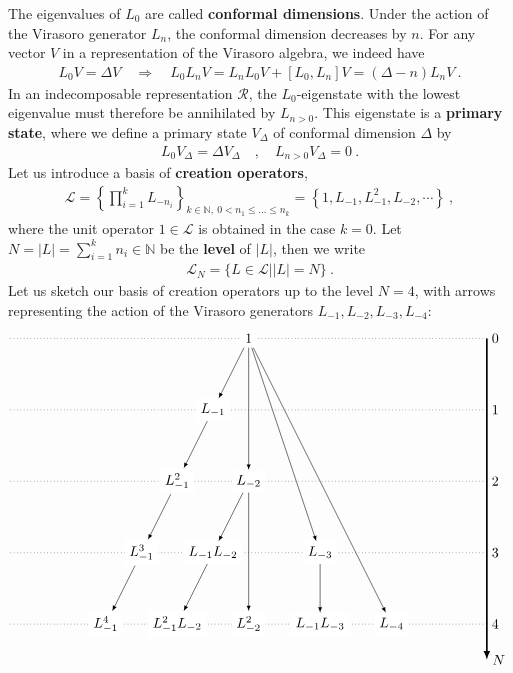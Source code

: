 \documentclass[12pt, a4paper]{article}
\newcommand{\myindex}[1]{\textbf{\boldmath #1}}
\begin{document}
The eigenvalues of $L_0$ are called \myindex{conformal dimensions}. Under the action of the Virasoro generator $L_n$, the conformal dimension decreases by $n$. For any vector $V$ in a representation of the Virasoro algebra, we indeed have
\begin{align}
 L_0V{} = \Delta V{} \quad \Rightarrow\quad  L_0 L_nV{} = L_nL_0V{} + [L_0, L_n] V{}  = (\Delta-n)L_nV{} \ .
\end{align}
In an indecomposable representation $\mathcal{R}$, the $L_0$-eigenstate with the lowest eigenvalue must therefore be annihilated by $L_{n>0}$. This eigenstate is a \myindex{primary state}, where we define a primary state $V_\Delta$ of conformal dimension $\Delta$ by 
\begin{align}
  \boxed{L_0 V_\Delta = \Delta V_\Delta \quad , \quad L_{n>0} V_\Delta = 0}\ .
 \end{align}
Let us introduce a basis of \myindex{creation operators},
\begin{align}
 \mathcal{L} = \left\{\prod_{i=1}^k L_{-n_i} \right\}_{k\in\mathbb{N},\ 0<n_1\leq \dots \leq n_k}=\left\{1, L_{-1}, L_{-1}^2, L_{-2},\cdots \right\}\ ,
 \label{lcm}
\end{align}
where the unit operator $1\in \mathcal{L}$ is obtained in the case $k=0$.
Let  $N=|L|=\sum_{i=1}^k n_i \in\mathbb{N}$ be the  \myindex{level} of $|L|$, then we write
\begin{align}
 \mathcal{L}_N = \Big\{ L\in\mathcal{L}\Big| |L|=N\Big\}\ . 
\label{ln}
 \end{align}
Let us sketch our basis of creation operators up to the level $N=4$, with arrows representing the action of the Virasoro generators $L_{-1},L_{-2},L_{-3},L_{-4}$:
 \begin{align}
 \begin{tikzpicture}[scale = .3, baseline=(current  bounding  box.center)]
  \draw[-latex, very thick] (20, 0) -- (20, -27) node [right] {$N$};
  \foreach \x in {0, ..., 4}
  {
  \draw [dotted] (-20, {-6*\x}) -- (20, {-6*\x}) node [right] {${\x}$};
  }
  \node[fill = white] at (0, 0) (0) {$1$};
  \node[fill = white] at (-3,-6) (1) {$L_{-1}$};
  \node[fill = white] at (-6, -12) (11) {$L_{-1}^2$};
  \node[fill = white] at (-9, -18) (111) {$L_{-1}^3$};
  \node[fill = white] at (-12, -24) (1111) {$L_{-1}^4$};
  \node[fill = white] at (0,-12) (2) {$L_{-2}$};
  \node[fill = white] at (-3,-18) (12) {$L_{-1}L_{-2}$};
  \node[fill = white] at (-6,-24) (112) {$L_{-1}^2L_{-2}$};
  \node[fill = white] at (0,-24) (22) {$L_{-2}^2$};
  \node[fill = white] at (6,-18) (3) {$L_{-3}$};
  \node[fill = white] at (6,-24) (13) {$L_{-1}L_{-3}$};
  \node[fill = white] at (12,-24) (4) {$L_{-4}$};
  \draw[-latex] (0) -- (1);
  \draw[-latex] (1) -- (11);
  \draw[-latex] (11) -- (111);
  \draw[-latex] (111) -- (1111);
  \draw[-latex] (0) -- (2);
  \draw[-latex] (0) -- (3);
  \draw[-latex] (0) -- (4);
  \draw[-latex] (2) -- (12);
  \draw[-latex] (12) -- (112);
  \draw[-latex] (2) -- (22);
  \draw[-latex] (3) -- (13);
 \end{tikzpicture}
 \label{verma}
\end{align}
\end{document}
